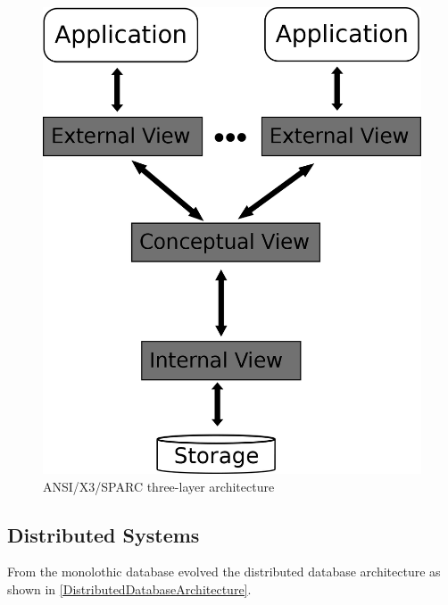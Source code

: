 \begin{figure}[H]
	\begin{center}
		\includegraphics[scale=0.5]{figures/monolithicalDatabaseArchitecture.png}
	\end{center}
	\caption{ANSI/X3/SPARC three-layer architecture \cite[p. 85]{DBLP:books/dp/LeserN2006}}
	\label{MonolithicDatabaseArchitecture}
\end{figure} 


\subsection{Distributed Systems}

From the monolothic database evolved the distributed database architecture as shown in \ref{DistributedDatabaseArchitecture}.


